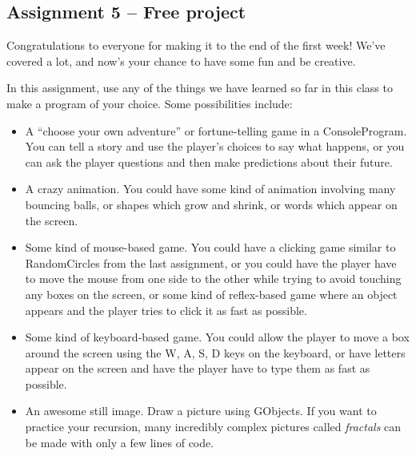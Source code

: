 \documentclass[11pt]{article}
\theoremstyle{plain}
\theoremstyle{definition}
\theoremstyle{remark}
\begin{document}
\begin{center}
\section*{Assignment 5 -- Free project}
\end{center}
Congratulations to everyone for making it to the end of the first week! We've
covered a lot, and now's your chance to have some fun and be creative.

In this assignment, use any of the things we have learned so far in this class
to make a program of your choice. Some possibilities include:
\begin{itemize}
  \item A ``choose your own adventure'' or fortune-telling game in a
    ConsoleProgram. You can tell a story and use the player's choices to say
    what happens, or you can ask the player questions and then make predictions
    about their future.
  \item A crazy animation. You could have some kind of animation involving many
    bouncing balls, or shapes which grow and shrink, or words which appear on
    the screen.
  \item Some kind of mouse-based game. You could have a clicking game similar to
    RandomCircles from the last assignment, or you could have the player have to
    move the mouse from one side to the other while trying to avoid touching any
    boxes on the screen, or some kind of reflex-based game where an object
    appears and the player tries to click it as fast as possible.
  \item Some kind of keyboard-based game. You could allow the player to move a
    box around the screen using the W, A, S, D keys on the keyboard, or have
    letters appear on the screen and have the player have to type them as fast
    as possible.
  \item An awesome still image. Draw a picture using GObjects. If you want to
    practice your recursion, many incredibly complex pictures called
    \emph{fractals} can be made with only a few lines of code.
\end{itemize}
\end{document}
